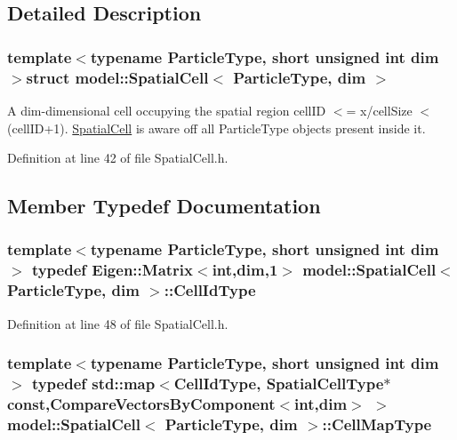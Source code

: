 \subsection{Detailed Description}
\subsubsection*{template$<$typename Particle\+Type, short unsigned int dim$>$struct model\+::\+Spatial\+Cell$<$ Particle\+Type, dim $>$}

A dim-\/dimensional cell occupying the spatial region cell\+I\+D $<$= x/cell\+Size $<$ (cell\+I\+D+1). \hyperlink{structmodel_1_1_spatial_cell}{Spatial\+Cell} is aware off all Particle\+Type objects present inside it. 

Definition at line 42 of file Spatial\+Cell.\+h.



\subsection{Member Typedef Documentation}
\hypertarget{structmodel_1_1_spatial_cell_acc48b0ece2bb5487d1ea96903dbbe626}{}
\subsubsection[{Cell\+Id\+Type}]{\setlength{\rightskip}{0pt plus 5cm}template$<$typename Particle\+Type, short unsigned int dim$>$ typedef Eigen\+::\+Matrix$<$int,{\bf dim},1$>$ {\bf model\+::\+Spatial\+Cell}$<$ Particle\+Type, {\bf dim} $>$\+::{\bf Cell\+Id\+Type}}\label{structmodel_1_1_spatial_cell_acc48b0ece2bb5487d1ea96903dbbe626}


Definition at line 48 of file Spatial\+Cell.\+h.

\hypertarget{structmodel_1_1_spatial_cell_a4c03425d6c8328b5587c9b385d1b9a26}{}
\subsubsection[{Cell\+Map\+Type}]{\setlength{\rightskip}{0pt plus 5cm}template$<$typename Particle\+Type, short unsigned int dim$>$ typedef std\+::map$<${\bf Cell\+Id\+Type}, {\bf Spatial\+Cell\+Type}$\ast$ const,{\bf Compare\+Vectors\+By\+Component}$<$int,{\bf dim}$>$ $>$ {\bf model\+::\+Spatial\+Cell}$<$ Particle\+Type, {\bf dim} $>$\+::{\bf Cell\+Map\+Type}}\label{structmodel_1_1_spatial_cell_a4c03425d6c8328b5587c9b385d1b9a26}


